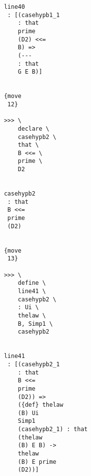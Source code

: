 \documentclass[12pt]{article}
\begin{document}
\begin{verbatim}
                                       line40 
                                        : [(casehypb1_1 
                                           : that 
                                           prime 
                                           (D2) <<= 
                                           B) => 
                                           (--- 
                                           : that 
                                           G E B)]


                                       {move 
                                        12}

                                       >>> \
                                           declare \
                                           casehypb2 \
                                           that \
                                           B <<= \
                                           prime \
                                           D2


                                       casehypb2 
                                        : that 
                                        B <<= 
                                        prime 
                                        (D2)


                                       {move 
                                        13}

                                       >>> \
                                           define \
                                           line41 \
                                           casehypb2 \
                                           : Ui \
                                           thelaw \
                                           B, Simp1 \
                                           casehypb2


                                       line41 
                                        : [(casehypb2_1 
                                           : that 
                                           B <<= 
                                           prime 
                                           (D2)) => 
                                           ({def} thelaw 
                                           (B) Ui 
                                           Simp1 
                                           (casehypb2_1) : that 
                                           (thelaw 
                                           (B) E B) -> 
                                           thelaw 
                                           (B) E prime 
                                           (D2))]



\end{verbatim}
\end{document}
